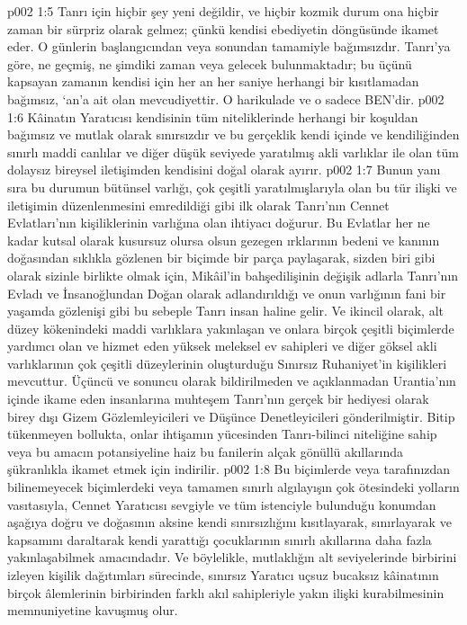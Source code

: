 \vs p002 1:5 Tanrı için hiçbir şey yeni değildir, ve hiçbir kozmik durum ona hiçbir zaman bir sürpriz olarak gelmez; çünkü kendisi ebediyetin döngüsünde ikamet eder. O günlerin başlangıcından veya sonundan tamamiyle bağımsızdır. Tanrı’ya göre, ne geçmiş, ne şimdiki zaman veya gelecek bulunmaktadır; bu üçünü kapsayan zamanın kendisi için her an her saniye herhangi bir kısıtlamadan bağımsız, ‘an’a ait olan mevcudiyettir. O harikulade ve o sadece BEN’dir.
\vs p002 1:6 Kâinatın Yaratıcısı kendisinin tüm niteliklerinde herhangi bir koşuldan bağımsız ve mutlak olarak sınırsızdır ve bu gerçeklik kendi içinde ve kendiliğinden sınırlı maddi canlılar ve diğer düşük seviyede yaratılmış akli varlıklar ile olan tüm dolaysız bireysel iletişimden kendisini doğal olarak ayırır.
\vs p002 1:7 Bunun yanı sıra bu durumun bütünsel varlığı, çok çeşitli yaratılmışlarıyla olan bu tür ilişki ve iletişimin düzenlenmesini emredildiği gibi ilk olarak Tanrı’nın Cennet Evlatları’nın kişiliklerinin varlığına olan ihtiyacı doğurur. Bu Evlatlar her ne kadar kutsal olarak kusursuz olursa olsun gezegen ırklarının bedeni ve kanının doğasından sıklıkla gözlenen bir biçimde bir parça paylaşarak, sizden biri gibi olarak sizinle birlikte olmak için, Mikâil’in bahşedilişinin değişik adlarla Tanrı’nın Evladı ve İnsanoğlundan Doğan olarak adlandırıldığı ve onun varlığının fani bir yaşamda gözlenişi gibi bu sebeple Tanrı insan haline gelir. Ve ikincil olarak, alt düzey kökenindeki maddi varlıklara yakınlaşan ve onlara birçok çeşitli biçimlerde yardımcı olan ve hizmet eden yüksek meleksel ev sahipleri ve diğer göksel akli varlıklarının çok çeşitli düzeylerinin oluşturduğu Sınırsız Ruhaniyet’in kişilikleri mevcuttur. Üçüncü ve sonuncu olarak bildirilmeden ve açıklanmadan Urantia’nın içinde ikame eden insanlarına muhteşem Tanrı’nın gerçek bir hediyesi olarak birey dışı Gizem Gözlemleyicileri ve Düşünce Denetleyicileri gönderilmiştir. Bitip tükenmeyen bollukta, onlar ihtişamın yücesinden Tanrı\hyp{}bilinci niteliğine sahip veya bu amacın potansiyeline haiz bu fanilerin alçak gönüllü akıllarında şükranlıkla ikamet etmek için indirilir.
\vs p002 1:8 Bu biçimlerde veya tarafınızdan bilinemeyecek biçimlerdeki veya tamamen sınırlı algılayışın çok ötesindeki yolların vasıtasıyla, Cennet Yaratıcısı sevgiyle ve tüm istenciyle bulunduğu konumdan aşağıya doğru ve doğasının aksine kendi sınırsızlığını kısıtlayarak, sınırlayarak ve kapsamını daraltarak kendi yarattığı çocuklarının sınırlı akıllarına daha fazla yakınlaşabilmek amacındadır. Ve böylelikle, mutlaklığın alt seviyelerinde birbirini izleyen kişilik dağıtımları sürecinde, sınırsız Yaratıcı uçsuz bucaksız kâinatının birçok âlemlerinin birbirinden farklı akıl sahipleriyle yakın ilişki kurabilmesinin memnuniyetine kavuşmuş olur.
